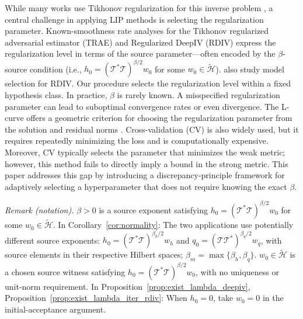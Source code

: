 \documentclass[12pt]{article}
\theoremstyle{plain}
\theoremstyle{definition}
\theoremstyle{remark}
\begin{document}
While many works use Tikhonov regularization for this inverse problem \citep{neweyNonparametricInstrumentalVariables2013,li2024regularized,bennettInferenceStronglyIdentified2023a,bennett2023source}, a central challenge in applying LIP methods is selecting the regularization parameter. Known-smoothness rate analyses for the Tikhonov regularized adversarial estimator (TRAE) \citep{bennettInferenceStronglyIdentified2023a,bennett2023source} and Regularized DeepIV (RDIV) \citep{li2024regularized} express the regularization level in terms of the source parameter---often encoded by the $\beta$-source condition (i.e., $h_{0}=\left(\mathcal{T}^{*}\mathcal{T}\right)^{\beta/2}w_{0}$ for some $w_{0}\in\tilde{\mathcal{H}}$). \citet{li2024regularized} also study model selection for RDIV. Our procedure selects the regularization level within a fixed hypothesis class. In practice, $\beta$ is rarely known. A misspecified regularization parameter can lead to suboptimal convergence rates or even divergence. The L-curve offers a geometric criterion for choosing the regularization parameter from the solution and residual norms \citep{hansen1992analysis}. Cross-validation (CV) is also widely used, but it requires repeatedly minimizing the loss and is computationally expensive. Moreover, CV typically selects the parameter that minimizes the weak metric; however, this method fails to directly imply a bound in the strong metric. This paper addresses this gap by introducing a discrepancy-principle framework for adaptively selecting a hyperparameter that does not require knowing the exact $\beta$.

\noindent\textit{Remark (notation).} $\beta>0$ is a source exponent satisfying $h_0=(\mathcal T^*\mathcal T)^{\beta/2}w_0$ for some $w_0\in\widetilde{\mathcal H}$. In Corollary~\ref{cor:normality}: The two applications use potentially different source exponents: $h_0=(\mathcal T^*\mathcal T)^{\beta_h/2}w_h$ and $q_0=(\mathcal T\mathcal T^*)^{\beta_q/2}w_q$, with source elements in their respective Hilbert spaces; $\beta_m=\max\{\beta_h,\beta_q\}$. $w_0\in\tilde{\mathcal H}$ is a chosen source witness satisfying $h_0=(\mathcal T^*\mathcal T)^{\beta/2}w_0$, with no uniqueness or unit-norm requirement. In Proposition~\ref{prop:exist_lambda_deepiv}, Proposition~\ref{prop:exist_lambda_iter_rdiv}: When $h_0=0$, take $w_0=0$ in the initial-acceptance argument.
\end{document}
